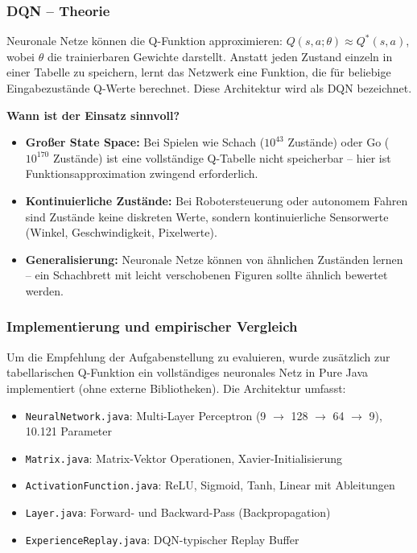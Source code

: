 \subsubsection{\ac{DQN} -- Theorie}

Neuronale Netze können die Q-Funktion approximieren: $Q(s, a; \theta) \approx Q^*(s, a)$, wobei $\theta$ die trainierbaren Gewichte darstellt. Anstatt jeden Zustand einzeln in einer Tabelle zu speichern, lernt das Netzwerk eine Funktion, die für beliebige Eingabezustände Q-Werte berechnet. Diese Architektur wird als \ac{DQN} bezeichnet.\autocite{amin_deep_2024}

\textbf{Wann ist der Einsatz sinnvoll?}
\begin{itemize}
    \item \textbf{Großer State Space:} Bei Spielen wie Schach ($10^{43}$ Zustände) oder Go ($10^{170}$ Zustände) ist eine vollständige Q-Tabelle nicht speicherbar -- hier ist Funktionsapproximation zwingend erforderlich.
    \item \textbf{Kontinuierliche Zustände:} Bei Robotersteuerung oder autonomem Fahren sind Zustände keine diskreten Werte, sondern kontinuierliche Sensorwerte (Winkel, Geschwindigkeit, Pixelwerte).
    \item \textbf{Generalisierung:} Neuronale Netze können von ähnlichen Zuständen lernen -- ein Schachbrett mit leicht verschobenen Figuren sollte ähnlich bewertet werden.
\end{itemize}

\subsubsection{Implementierung und empirischer Vergleich}

Um die Empfehlung der Aufgabenstellung zu evaluieren, wurde zusätzlich zur tabellarischen Q-Funktion ein vollständiges neuronales Netz in Pure Java implementiert (ohne externe Bibliotheken). Die Architektur umfasst:

\begin{itemize}
    \item \texttt{NeuralNetwork.java}: Multi-Layer Perceptron (9 $\rightarrow$ 128 $\rightarrow$ 64 $\rightarrow$ 9), 10.121 Parameter
    \item \texttt{Matrix.java}: Matrix-Vektor Operationen, Xavier-Initialisierung
    \item \texttt{ActivationFunction.java}: ReLU, Sigmoid, Tanh, Linear mit Ableitungen
    \item \texttt{Layer.java}: Forward- und Backward-Pass (Backpropagation)
    \item \texttt{ExperienceReplay.java}: \ac{DQN}-typischer Replay Buffer
\end{itemize}

